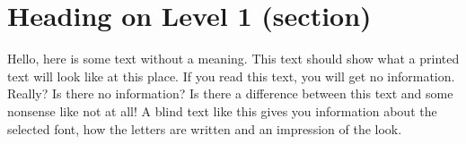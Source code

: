 \documentclass{article}
\begin{document}
	\section{Heading on Level 1 (section)}
	Hello, here is some text without a meaning. This text should show what a printed text will look like at this place.  If you read this text, you will get no information.  Really?  Is there no information?  Is there a difference between this text and some nonsense like not at all!  A blind text like this gives you information about the selected font, how the letters are written and an impression of the look.
\end{document}
